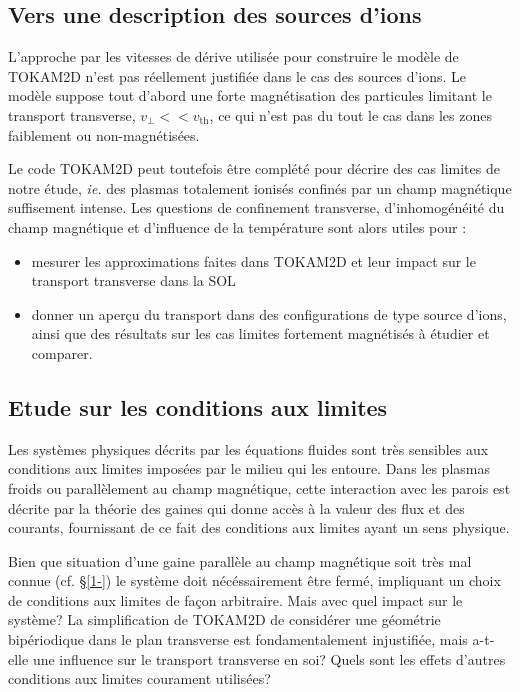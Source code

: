 \begin{refsection}
\section{Vers une description des sources d'ions}
L'approche par les vitesses de dérive utilisée pour construire le modèle de TOKAM2D n'est pas 
réellement justifiée dans le cas des sources d'ions. Le modèle suppose tout
d'abord une forte magnétisation des particules limitant le transport transverse,
$v_\perp<<v_\text{th}$, ce qui n'est pas du tout le cas dans les zones faiblement ou non-magnétisées. 

Le code TOKAM2D peut toutefois être complété pour décrire des cas limites de notre étude, \emph{ie.} des plasmas totalement ionisés
confinés par un champ magnétique suffisement intense. Les questions de confinement transverse, d'inhomogénéité du champ 
magnétique et d'influence de la température sont alors utiles pour :
\begin{itemize}
	\item mesurer les approximations faites dans TOKAM2D et leur impact sur le transport transverse dans la SOL
	\item donner un aperçu du transport dans des configurations de type source d'ions, ainsi que des résultats sur les 
	cas limites fortement magnétisés à étudier et comparer.
\end{itemize}
	\subsection{Etude sur les conditions aux limites}
	Les systèmes physiques décrits par les équations fluides sont très sensibles
	aux conditions aux limites imposées par le milieu qui les entoure. Dans les
	plasmas froids ou parallèlement au champ magnétique, cette
	interaction avec les parois est décrite par la théorie des gaines qui donne
	accès à la valeur des flux et des courants, fournissant de ce fait des conditions aux
	limites ayant un sens physique. 
	
	Bien que situation d'une gaine parallèle au champ magnétique soit très mal
	connue (cf. §\ref{1-}) le système doit nécéssairement être fermé, impliquant un
	choix de conditions aux limites de façon arbitraire. Mais avec quel impact sur le
	système? La simplification de TOKAM2D de considérer une géométrie bipériodique
	dans le plan transverse est fondamentalement injustifiée, mais a-t-elle une
	influence sur le transport transverse en soi? Quels sont les effets d'autres
	conditions aux limites courament utilisées?
	

\end{refsection}
